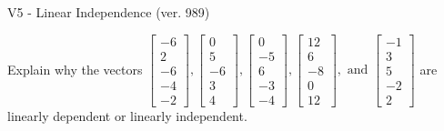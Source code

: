 \begin{exercise}
  \begin{exerciseTitle}V5 - Linear Independence (ver. 989)\end{exerciseTitle}
  \begin{exerciseStatement}
    Explain why the vectors \(\left[\begin{array}{r}
-6 \\
2 \\
-6 \\
-4 \\
-2
\end{array}\right] , \left[\begin{array}{r}
0 \\
5 \\
-6 \\
3 \\
4
\end{array}\right] , \left[\begin{array}{r}
0 \\
-5 \\
6 \\
-3 \\
-4
\end{array}\right] , \left[\begin{array}{r}
12 \\
6 \\
-8 \\
0 \\
12
\end{array}\right] , \text{ and } \left[\begin{array}{r}
-1 \\
3 \\
5 \\
-2 \\
2
\end{array}\right]\) are linearly dependent or linearly independent.	



\end{exerciseStatement}
\end{exercise}

